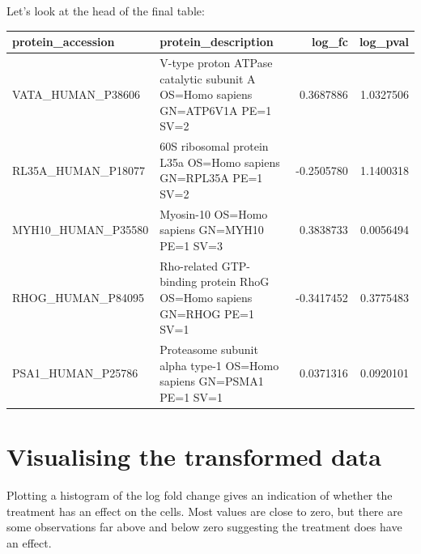 \documentclass[12pt,]{book}
\newenvironment{Shaded}{\begin{snugshade}}{\end{snugshade}}
\newcommand{\CommentTok}[1]{\textcolor[rgb]{0.56,0.35,0.01}{\textit{#1}}}
\newcommand{\DataTypeTok}[1]{\textcolor[rgb]{0.13,0.29,0.53}{#1}}
\newcommand{\FloatTok}[1]{\textcolor[rgb]{0.00,0.00,0.81}{#1}}
\newcommand{\KeywordTok}[1]{\textcolor[rgb]{0.13,0.29,0.53}{\textbf{#1}}}
\newcommand{\NormalTok}[1]{#1}
\newcommand{\OperatorTok}[1]{\textcolor[rgb]{0.81,0.36,0.00}{\textbf{#1}}}
\newcommand{\StringTok}[1]{\textcolor[rgb]{0.31,0.60,0.02}{#1}}
\begin{document}
Let's look at the head of the final table:

\begin{tabular}{llrr}
\toprule
protein\_accession & protein\_description & log\_fc & log\_pval\\
\midrule
VATA\_HUMAN\_P38606 & V-type proton ATPase catalytic subunit A OS=Homo sapiens GN=ATP6V1A PE=1 SV=2 & 0.3687886 & 1.0327506\\
RL35A\_HUMAN\_P18077 & 60S ribosomal protein L35a OS=Homo sapiens GN=RPL35A PE=1 SV=2 & -0.2505780 & 1.1400318\\
MYH10\_HUMAN\_P35580 & Myosin-10 OS=Homo sapiens GN=MYH10 PE=1 SV=3 & 0.3838733 & 0.0056494\\
RHOG\_HUMAN\_P84095 & Rho-related GTP-binding protein RhoG OS=Homo sapiens GN=RHOG PE=1 SV=1 & -0.3417452 & 0.3775483\\
PSA1\_HUMAN\_P25786 & Proteasome subunit alpha type-1 OS=Homo sapiens GN=PSMA1 PE=1 SV=1 & 0.0371316 & 0.0920101\\
\bottomrule
\end{tabular}

\hypertarget{visualising-the-transformed-data}{%
\section{Visualising the transformed data}\label{visualising-the-transformed-data}}

Plotting a histogram of the log fold change gives an indication of whether the
treatment has an effect on the cells. Most values are close to zero, but there
are some observations far above and below zero suggesting the treatment
does have an effect.



\begin{Shaded}
\end{Shaded}
\end{document}
